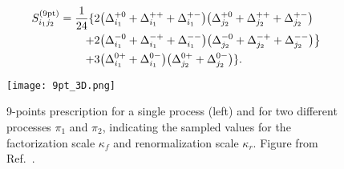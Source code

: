 \begin{equation}\label{9M}
\begin{split}
    S^{(\rm 9pt)}_{i_1j_2} =
    \frac{1}{24}\{&2\big(\Delta_{i_1}^{+0}+\Delta_{i_1}^{++}
    + \Delta_{i_1}^{+-}\big) \big(\Delta_{j_2}^{+0} +
    \Delta_{j_2}^{++} + \Delta_{j_2}^{+-} \big) \\ 
            + &2\big(\Delta_{i_1}^{-0} + \Delta_{i_1}^{-+} +
            \Delta_{i_1}^{--}\big)\big(\Delta_{j_2}^{-0} +
            \Delta_{j_2}^{-+} + \Delta_{j_2}^{--} \big) \big\}\\ 
            + &3\big(\Delta_{i_1}^{0+}+ \Delta_{i_1}^{0-}\big)\big(\Delta_{j_2}^{0+} + \Delta_{j_2}^{0-} \big)\}.
\end{split}            
\end{equation}

\begin{figure}[t]
    \centering
    {}
    \texttt{[image: 9pt\_3D.png]}
    \begin{caption}{9-points prescription for a single process (left) and for two different processes $\pi_1$
        and $\pi_2$, indicating
        the sampled values for the factorization scale $\kappa_f$ and 
        renormalization scale $\kappa_r$. Figure from Ref.~\cite{AbdulKhalek:2019ihb}.
    \label{fig:symmetricPrescriptions}
      }
    \end{caption}
    \end{figure}

